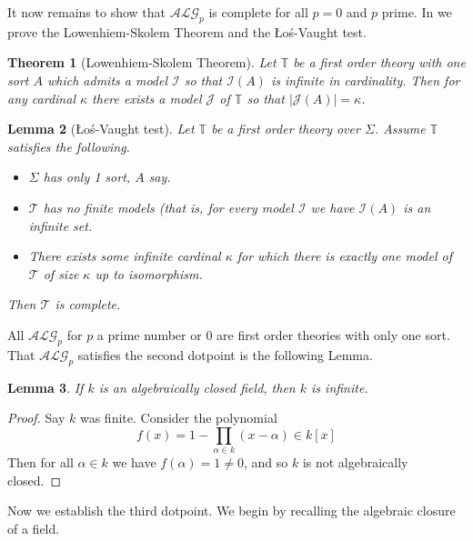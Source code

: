 \documentclass[12pt]{article}
\theoremstyle{plain}
\newtheorem{thm}{Theorem}[subsection] %
\newtheorem{lemma}[thm]{Lemma}
\theoremstyle{definition}
\newcommand{\bb}[1]{\mathbb{#1}}
\newcommand{\call}[1]{\mathcal{#1}}
\begin{document}
	It now remains to show that $\call{ALG}_p$ is complete for all $p = 0$ and $p$ prime. In \cite{FOL} we prove the Lowenhiem-Skolem Theorem and the \L o\'{s}-Vaught test.
	
	\begin{thm}[Lowenhiem-Skolem Theorem]
		Let $\bb{T}$ be a first order theory with one sort $A$ which admits a model $\call{I}$ so that $\call{I}(A)$ is infinite in cardinality. Then for any cardinal $\kappa$ there exists a model $\call{J}$ of $\bb{T}$ so that $|\call{J}(A)| = \kappa$.
	\end{thm}
	
	\begin{lemma}[\L o\'{s}-Vaught test]
		Let $\bb{T}$ be a first order theory over $\Sigma$. Assume $\bb{T}$ satisfies the following.
		\begin{itemize}
			\item $\Sigma$ has only 1 sort, $A$ say.
			\item $\call{T}$ has no finite models (that is, for every model $\call{I}$ we have $\call{I}(A)$ is an infinite set.
			\item There exists some infinite cardinal $\kappa$ for which there is exactly one model of $\call{T}$ of size $\kappa$ up to isomorphism.
		\end{itemize}
		Then $\call{T}$ is complete.
	\end{lemma}
	
	All $\call{ALG}_p$ for $p$ a prime number or $0$ are first order theories with only one sort. That $\call{ALG}_p$ satisfies the second dotpoint is the following Lemma.
	
	\begin{lemma}
		If $k$ is an algebraically closed field, then $k$ is infinite.
	\end{lemma}
	\begin{proof}
		Say $k$ was finite. Consider the polynomial
		\begin{equation}
			f(x) = 1 - \prod_{\alpha \in k}(x - \alpha) \in k[x]
		\end{equation}
		Then for all $\alpha \in k$ we have $f(\alpha) = 1 \neq 0$, and so $k$ is not algebraically closed.
	\end{proof}
	
	Now we establish the third dotpoint. We begin by recalling the algebraic closure of a field.
	
\end{document}
